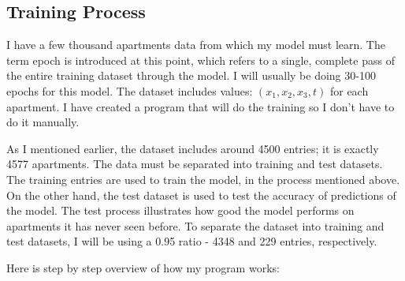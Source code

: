 \documentclass{article}
\begin{document}
\subsection{Training Process}

I have a few thousand apartments data from which my model must learn.
The term epoch is introduced at this point, which refers to a single, complete
pass of the entire training dataset through the model. I will usually be doing
30-100 epochs for this model.
The dataset includes
values: $(x_1, x_2, x_3, t)$ for each apartment. I have created a program that
will do the training so I don't have to do it manually.


As I mentioned earlier, the dataset includes around 4500 entries; it is exactly
4577 apartments. The data must be separated into training and test datasets. The
training entries are used to train the model, in the process mentioned above.
On the other hand, the test dataset is used to test the accuracy of predictions
of the model. The test process illustrates how good the model performs on
apartments it has never seen before. To separate the dataset into training and
test datasets, I will be using a 0.95 ratio - 4348 and 229 entries, respectively.

Here is step by step overview of how my program works:
\end{document}
